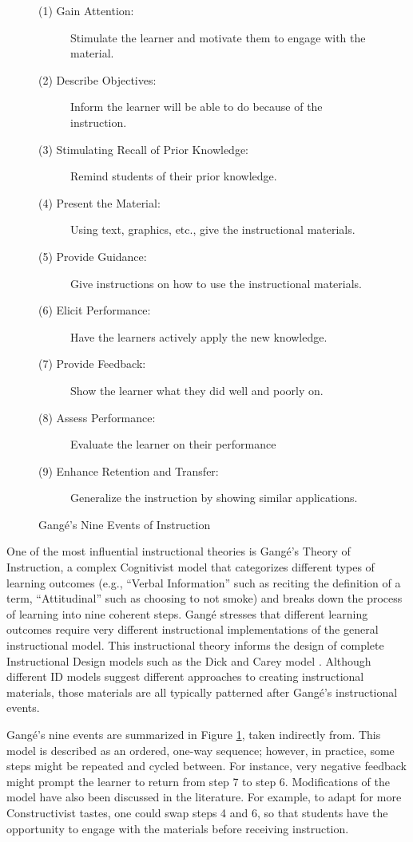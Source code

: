 \documentclass{sig-alternate}
\begin{document}
\begin{figure}
\begin{description}
	\item[(1) Gain Attention:] Stimulate the learner and motivate them to engage with the material.
	\item[(2) Describe Objectives:] Inform the learner will be able to do because of the instruction.
	\item[(3) Stimulating Recall of Prior Knowledge:] Remind students of their prior knowledge.
	\item[(4) Present the Material:] Using text, graphics, etc., give the instructional materials.
	\item[(5) Provide Guidance:] Give instructions on how to use the instructional materials.
	\item[(6) Elicit Performance:] Have the learners actively apply the new knowledge.
	\item[(7) Provide Feedback:] Show the learner what they did well and poorly on.
	\item[(8) Assess Performance:] Evaluate the learner on their performance
	\item[(9) Enhance Retention and Transfer:] Generalize the instruction by showing similar applications.
\end{description}
\caption{Gang\'{e}'s Nine Events of Instruction}
\label{gange-events}
\end{figure}


One of the most influential\cite{anglin1992reference} instructional theories is Gang\'{e}'s Theory of Instruction, a complex Cognitivist model that categorizes different types of learning outcomes (e.g., ``Verbal Information'' such as reciting the definition of a term, ``Attitudinal'' such as choosing to not smoke) and breaks down the process of learning into nine coherent steps. Gang\'{e} stresses that different learning outcomes require very different instructional implementations of the general instructional model. This instructional theory informs the design of complete Instructional Design models such as the Dick and Carey model \cite{carey2001systematic}. Although different ID models suggest different approaches to creating instructional materials, those materials are all typically patterned after Gang\'{e}'s instructional events.

Gang\'{e}'s nine events are summarized in Figure \ref{gange-events}, taken indirectly from\cite{gagne1985conditions}. This model is described as an ordered, one-way sequence; however, in practice, some steps might be repeated and cycled between. For instance, very negative feedback might prompt the learner to return from step 7 to step 6. Modifications of the model have also been discussed in the literature. For example, to adapt for more Constructivist tastes, one could swap steps 4 and 6, so that students have the opportunity to engage with the materials before receiving instruction.
\end{document}

